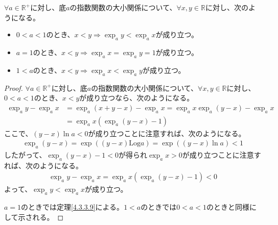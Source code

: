 \documentclass[dvipdfmx]{jsarticle}
\begin{document}
\begin{thm}\label{4.3.3.14}
$\forall a \in \mathbb{R}^{+}$に対し、底$a$の指数関数の大小関係について、$\forall x,y \in \mathbb{R}$に対し、次のようになる。
\begin{itemize}
\item
  $0 < a < 1$のとき、$x < y \Rightarrow \exp_{a}y < \exp_{a}x$が成り立つ。
\item
  $a = 1$のとき、$x < y \Rightarrow \exp_{a}x = \exp_{a}y = 1$が成り立つ。
\item
  $1 < a$のとき、$x < y \Rightarrow \exp_{a}x < \exp_{a}y$が成り立つ。
\end{itemize}
\end{thm}
\begin{proof}
$\forall a \in \mathbb{R}^{+}$に対し、底$a$の指数関数の大小関係について、$\forall x,y \in \mathbb{R}$に対し、$0 < a < 1$のとき、$x < y$が成り立つなら、次のようになる。
\begin{align*}
\exp_{a}y - \exp_{a}x &= \exp_{a}(x + y - x) - \exp_{a}x = \exp_{a}x\exp_{a}(y - x) - \exp_{a}x\\
&= \exp_{a}x\left( \exp_{a}(y - x) - 1 \right)
\end{align*}
ここで、$(y - x)\ln a < 0$が成り立つことに注意すれば、次のようになる。
\begin{align*}
\exp_{a}(y - x) = \exp\left( (y - x)\mathrm{Log}a \right) = \exp\left( (y - x)\ln a \right) < 1
\end{align*}
したがって、$\exp_{a}(y - x) - 1 < 0$が得られ$\exp_{a}x > 0$が成り立つことに注意すれば、次のようになる。
\begin{align*}
\exp_{a}y - \exp_{a}x = \exp_{a}x\left( \exp_{a}(y - x) - 1 \right) < 0
\end{align*}
よって、$\exp_{a}y < \exp_{a}x$が成り立つ。\par
$a = 1$のときでは定理\ref{4.3.3.9}による。$1 < a$のときでは$0 < a < 1$のときと同様にして示される。
\end{proof}
\end{document}
